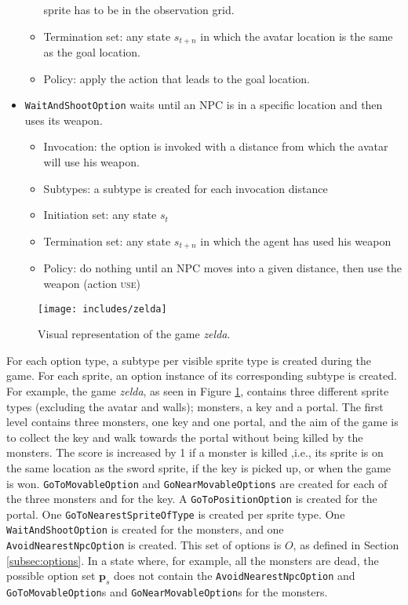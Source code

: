 \begin{itemize}
\begin{itemize}
				sprite has to be in the observation grid.
			\item Termination set: any state $s_{t+n}$ in which the avatar
				location is the same as the goal location.
			\item Policy: apply the action that leads to the goal
				location.
		\end{itemize}
	\item \texttt{WaitAndShootOption} waits until an NPC is in a specific location and
		then uses its weapon.
		\begin{itemize}
			\item Invocation: the option is invoked with a distance from which
				the avatar will use his weapon.
			\item Subtypes: a subtype is created for each invocation distance
			\item Initiation set: any state $s_t$
			\item Termination set: any state $s_{t+n}$ in which the agent has
				used his weapon
			\item Policy: do nothing until an NPC moves into a given distance,
				then use the weapon (action \textsc{use})
		\end{itemize}
\end{itemize}

\begin{figure}
	\centering
	\texttt{[image: includes/zelda]}
	\caption{Visual representation of the game \textit{zelda}.}
	\label{fig:zelda}
\end{figure}

For each option type, a subtype per visible sprite type is created during the
game. For each sprite, an option instance of its corresponding subtype is
created. For example, the game \textit{zelda}, as seen in Figure \ref{fig:zelda},
contains three different sprite types (excluding the avatar and walls);
monsters, a key and a portal. The first level contains three monsters, one key
and one portal, and the aim of the game is to collect the key and walk towards
the portal without being killed by the monsters. The score is increased by 1 if
a monster is killed ,i.e., its sprite is on the same location as the sword
sprite, if the key is picked up, or when the game is won.
\texttt{GoToMovableOption} and \texttt{GoNearMovableOptions} are created for
each of the three monsters and for the key. A \texttt{GoToPositionOption} is
created for the portal.  One \texttt{GoToNearestSpriteOfType} is created per
sprite type. One \texttt{WaitAndShootOption} is created for the monsters, and
one \texttt{AvoidNearestNpc\-Option} is created. This set of options is $O$, as
defined in Section \ref{subsec:options}. In a state where, for example, all the
monsters are dead, the possible option set $\mathbf{p}_s$ does not contain the
\texttt{AvoidNearestNpcOption} and \texttt{GoToMovableOption}s and
\texttt{GoNearMovableOption}s for the monsters.

